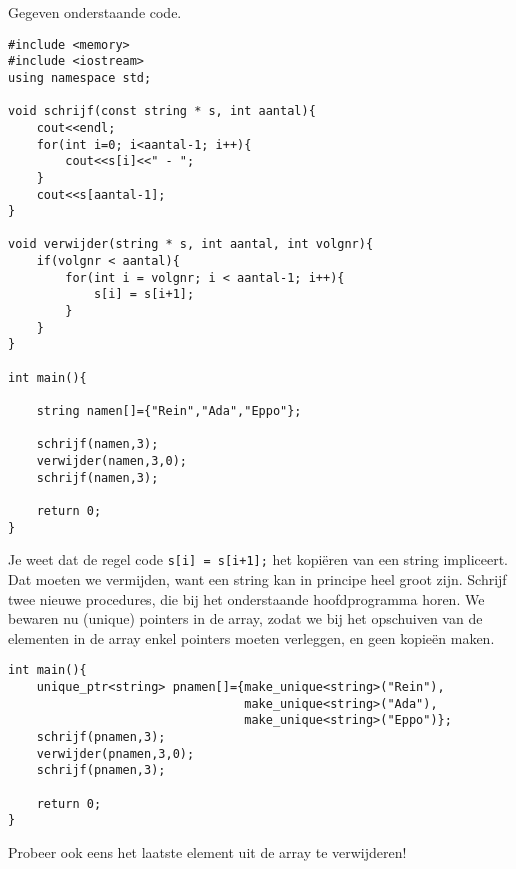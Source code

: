 \beginoef

Gegeven onderstaande code.
\begin{footnotesize}
\begin{verbatim}
#include <memory>
#include <iostream>
using namespace std;

void schrijf(const string * s, int aantal){
    cout<<endl;
    for(int i=0; i<aantal-1; i++){
        cout<<s[i]<<" - ";
    }
    cout<<s[aantal-1];
}

void verwijder(string * s, int aantal, int volgnr){
    if(volgnr < aantal){
        for(int i = volgnr; i < aantal-1; i++){
            s[i] = s[i+1];	
        }
    }
}

int main(){
	
    string namen[]={"Rein","Ada","Eppo"};
	
    schrijf(namen,3);
    verwijder(namen,3,0);
    schrijf(namen,3);
	
    return 0;
}
\end{verbatim}
\end{footnotesize}
Je weet dat de regel code \verb}s[i] = s[i+1];} het kopi\"eren van een string impliceert.
Dat moeten we vermijden, want een string kan in principe heel groot zijn. 
Schrijf twee nieuwe procedures, die bij het onderstaande hoofdprogramma horen.
We bewaren nu (unique) pointers in de array, zodat we bij het opschuiven van de elementen in de array
enkel pointers moeten verleggen, en geen kopie\"en maken.
\begin{footnotesize}
\begin{verbatim}
int main(){
    unique_ptr<string> pnamen[]={make_unique<string>("Rein"),
                                 make_unique<string>("Ada"), 
                                 make_unique<string>("Eppo")};	 
    schrijf(pnamen,3);
    verwijder(pnamen,3,0);
    schrijf(pnamen,3);
	
    return 0;
}
\end{verbatim}
\end{footnotesize}
Probeer ook eens het laatste element uit de array te verwijderen!

\endoef

